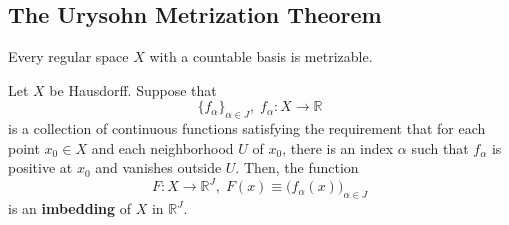  \subsection{The Urysohn Metrization Theorem}

    \begin{theorem}
    Every regular space $X$ with a countable basis is metrizable. 
    \end{theorem}

    \begin{theorem}
    Let $X$ be Hausdorff. Suppose that 
    \[\{f_\alpha\}_{\alpha \in J}, \; f_\alpha: X \longrightarrow \mathbb{R}\]
    is a collection of continuous functions satisfying the requirement that for each point $x_0 \in X$ and each neighborhood $U$ of $x_0$, there is an index $\alpha$ such that $f_\alpha$ is positive at $x_0$ and vanishes outside $U$. Then, the function 
    \[F: X \longrightarrow \mathbb{R}^J, \; F(x) \equiv \big( f_\alpha (x)\big)_{\alpha \in J}\]
    is an \textbf{imbedding} of $X$ in $\mathbb{R}^J$.
    \end{theorem}

